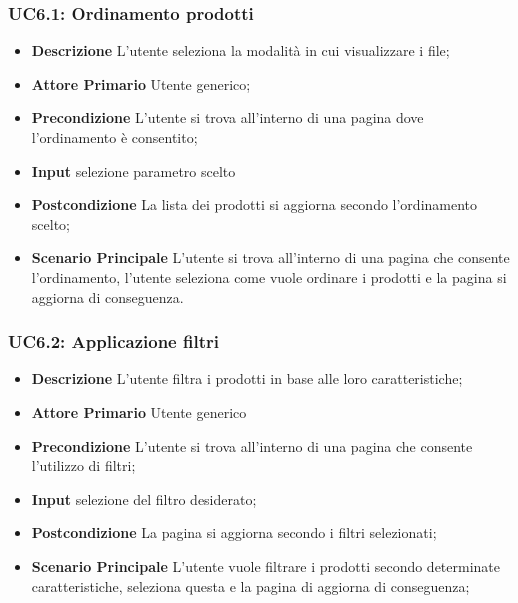         \subsubsection{UC6.1: Ordinamento prodotti}
        \begin{itemize}
            \item \textbf{Descrizione} L'utente seleziona la modalità in cui visualizzare i file;
            \item \textbf{Attore Primario} Utente generico;
            \item \textbf{Precondizione} L'utente si trova all'interno di una pagina dove l'ordinamento è consentito;
            \item \textbf{Input} selezione parametro scelto
            \item \textbf{Postcondizione} La lista dei prodotti si aggiorna secondo l'ordinamento scelto;
            \item \textbf{Scenario Principale} L'utente si trova all'interno di una pagina che consente l'ordinamento, l'utente seleziona come vuole ordinare i prodotti e la pagina si aggiorna di conseguenza.
        \end{itemize}
        \subsubsection{UC6.2: Applicazione filtri}
        \begin{itemize}
            \item \textbf{Descrizione} L'utente filtra i prodotti in base alle loro caratteristiche;
            \item \textbf{Attore Primario} Utente generico
            \item \textbf{Precondizione} L'utente si trova all'interno di una pagina che consente l'utilizzo di filtri;
            \item \textbf{Input} selezione del filtro desiderato;
            \item \textbf{Postcondizione} La pagina si aggiorna secondo i filtri selezionati;
            \item \textbf{Scenario Principale} L'utente vuole filtrare i prodotti secondo determinate caratteristiche, seleziona questa e la pagina di aggiorna di conseguenza;
        \end{itemize}
